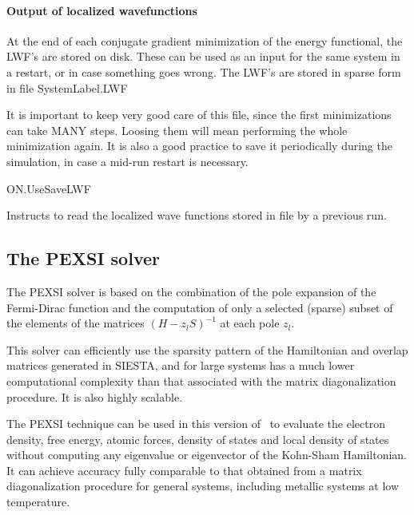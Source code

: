 \paragraph{Output of localized wavefunctions}

At the end of each conjugate gradient minimization of the energy
functional, the LWF's are stored on disk. These can be used as an
input for the same system in a restart, or in case something goes
wrong.  The LWF's are stored in sparse form in file SystemLabel.LWF

It is important to keep very good care of this file, since the first
minimizations can take MANY steps. Loosing them will mean performing
the whole minimization again. It is also a good practice to save it
periodically during the simulation, in case a mid-run restart is
necessary.

\begin{fdflogicalF}{ON.UseSaveLWF}

  Instructs to read the localized wave functions stored in file
   by a previous run.

\end{fdflogicalF}


\subsection{The PEXSI solver}
\label{SolverPEXSI}

The PEXSI solver is based on the combination of the pole expansion of
the Fermi-Dirac function and the computation of only a selected
(sparse) subset of the elements of the matrices $(H-z_lS)^{-1}$ at
each pole $z_l$.

This solver can efficiently use the sparsity pattern of
the Hamiltonian and overlap matrices generated in SIESTA, and for
large systems has a much lower computational complexity than that
associated with the matrix diagonalization procedure. It is also
highly scalable.

The PEXSI technique can be used in this version of \siesta\ to evaluate the electron density, free
energy, atomic forces, density of states and local density of states
without computing any eigenvalue or eigenvector of the Kohn-Sham
Hamiltonian. It can achieve accuracy fully comparable to that obtained
from a matrix diagonalization procedure for general systems, including
metallic systems at low temperature.  


